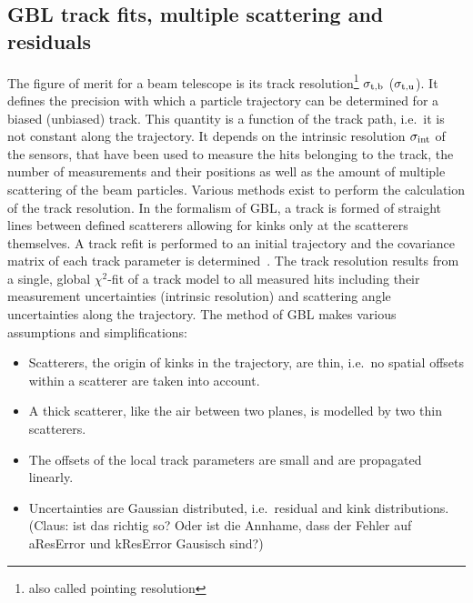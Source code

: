 \subsection{GBL track fits, multiple scattering and residuals}
\label{sec:resmultiple}

The figure of merit for a beam telescope is its track resolution\footnote{also called pointing resolution} $\sigma_{\textrm{t,b}}$ ($\sigma_{\textrm{t,u}}$).
It defines the precision with which a particle trajectory can be determined for a biased (unbiased) track. 
This quantity is a function of the track path, i.e.\ it is not constant along the trajectory. 
It depends on the intrinsic resolution $\sigma_{\textrm{int}}$ of the sensors, that have been used to measure the hits belonging to the track, the number of measurements and their positions
 as well as the amount of multiple scattering of the beam particles.
Various methods exist to perform the calculation of the track resolution. 
In the formalism of GBL, a track is formed of straight lines between defined scatterers allowing for kinks only at the scatterers themselves. 
A track refit is performed to an initial trajectory and the covariance matrix of each track parameter is determined~\cite{Blobel20111760,Kleinwort-2012}. 
The track resolution results from a single, global $\chi^2$-fit of a track model to all measured hits including their measurement uncertainties (intrinsic resolution)
 and scattering angle uncertainties along the trajectory. 
The method of GBL makes various assumptions and simplifications:

\begin{itemize}
 \item Scatterers, the origin of kinks in the trajectory, are thin, i.e.\ no spatial offsets within a scatterer are taken into account. 
 \item A thick scatterer, like the air between two planes, is modelled by two thin scatterers. 
 \item The offsets of the local track parameters are small and are propagated linearly. 
 \item Uncertainties are Gaussian distributed, i.e.\ residual and kink distributions. \\(Claus: ist das richtig so? Oder ist die Annhame, dass der Fehler auf aResError und kResError Gausisch sind?)
\end{itemize}
 
